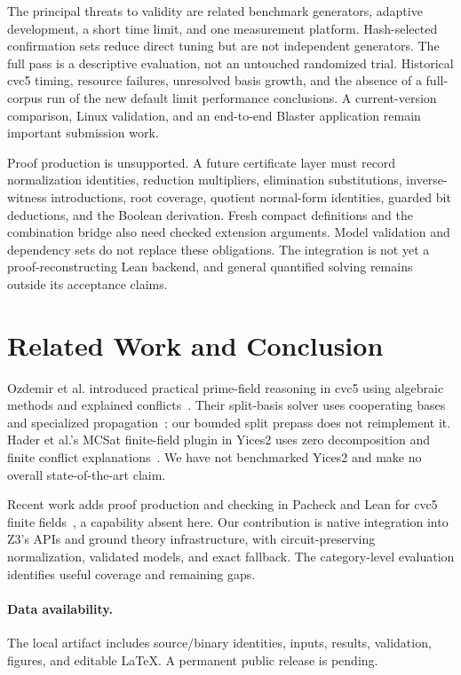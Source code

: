 \documentclass[runningheads]{llncs}
\begin{document}
The principal threats to validity are related benchmark generators, adaptive
development, a short time limit, and one measurement platform. Hash-selected
confirmation sets reduce direct tuning but are not independent generators.
The full pass is a descriptive evaluation, not an untouched randomized trial.
Historical cvc5 timing, resource failures, unresolved basis growth, and the
absence of a full-corpus run of the new default limit performance conclusions. A current-version comparison, Linux validation, and
an end-to-end Blaster application remain important submission work.

Proof production is unsupported. A future certificate layer must record
normalization identities, reduction multipliers, elimination substitutions,
inverse-witness introductions, root coverage, quotient normal-form identities, guarded bit deductions, and
the Boolean derivation. Fresh compact definitions and the combination bridge also
need checked extension arguments. Model validation and dependency sets do not
replace these obligations. The integration is not yet a proof-reconstructing
Lean backend, and general quantified solving remains outside its acceptance
claims.

\section{Related Work and Conclusion}

Ozdemir et al. introduced practical prime-field reasoning in cvc5 using
algebraic methods and explained conflicts~\cite{ff23}. Their split-basis solver
uses cooperating bases and specialized propagation~\cite{split24}; our bounded
split prepass does not reimplement it. Hader et al.'s MCSat finite-field plugin
in Yices2 uses zero decomposition and finite conflict explanations~\cite{yices}.
We have not benchmarked Yices2 and make no overall state-of-the-art claim.

Recent work adds proof production and checking in Pacheck and Lean for cvc5
finite fields~\cite{proof26}, a capability absent here. Our contribution is
native integration into Z3's APIs and ground theory infrastructure, with
circuit-preserving normalization, validated models, and exact fallback.
The category-level evaluation identifies useful coverage and remaining gaps.

\paragraph{Data availability.}
The local artifact includes source/binary identities, inputs, results,
validation, figures, and editable LaTeX. A permanent public release is pending.
\end{document}
